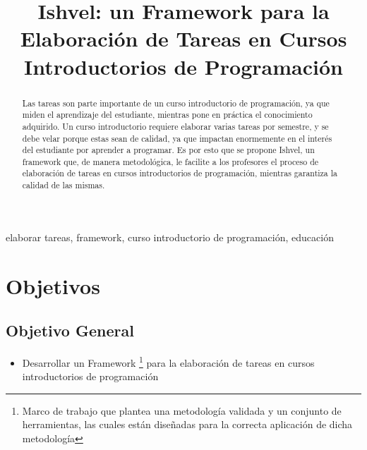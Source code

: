 \documentclass[conference]{IEEEtran}
\begin{document}
\title{Ishvel: un Framework para la Elaboración de Tareas en Cursos Introductorios de Programación \\
}

\author{
}

\maketitle

\begin{abstract}
Las tareas son parte importante de un curso introductorio de programación, ya que miden el aprendizaje del estudiante, mientras pone en práctica el conocimiento adquirido. Un curso introductorio requiere elaborar varias tareas por semestre, y se debe velar porque estas sean de calidad, ya que impactan enormemente en el interés del estudiante por aprender a programar. Es por esto que se propone Ishvel, un framework que, de manera metodológica, le facilite a los profesores el proceso de elaboración de tareas en cursos introductorios de programación, mientras garantiza la calidad de las mismas.
\end{abstract}

\begin{IEEEkeywords}
elaborar tareas, framework, curso introductorio de programación, educación
\end{IEEEkeywords}

\section{Objetivos}

\subsection*{Objetivo General}

\begin{itemize}
    \item Desarrollar un Framework \footnote{Marco de trabajo que plantea una metodología validada y un conjunto de herramientas, las cuales están diseñadas para la correcta aplicación de dicha metodología} para la elaboración de tareas en cursos introductorios de programación
\end{itemize}
\end{document}
